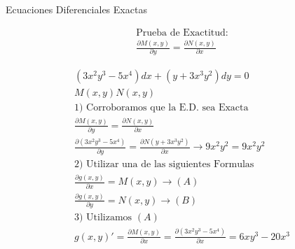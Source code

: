 \documentclass{article}
\begin{document}
Ecuaciones Diferenciales Exactas


\begin{gather*}
\text{Prueba de Exactitud:} \\
\frac{\partial M(x,y)}{\partial y} = \frac{\partial N(x,y)}{\partial x}
\end{gather*}





\begin{gather*}
(3x^{2}y^{3}-5x^{4})dx+(y+3x^{3}y^{2})dy=0 \\
M(x,y)                    N(x,y)         \\
1)\text{ Corroboramos que la E.D. sea Exacta} \\
\frac{\partial M(x,y)}{\partial y} = \frac{\partial N(x,y)}{\partial x} \\
\frac{\partial (3x^{2}y^{3}-5x^{4})}{\partial y} = \frac{\partial N(y+3x^{3}y^{2})}{\partial x}  \rightarrow 9x^{2}y^{2} = 9x^{2}y^{2} \\
2)\text{ Utilizar una de las siguientes Formulas} \\
\frac{\partial g(x,y)}{\partial x} = M(x,y)   \rightarrow  (A) \\
\frac{\partial g(x,y)}{\partial y} = N(x,y) \rightarrow  (B) \\
3)\text{ Utilizamos }(A) \\
g(x,y)' = \frac{\partial M(x,y)}{\partial x} =\frac{\partial (3x^{2}y^{3}-5x^{4})}{\partial x} = 6xy^{3}-20x^{3}
\end{gather*}
\end{document}
